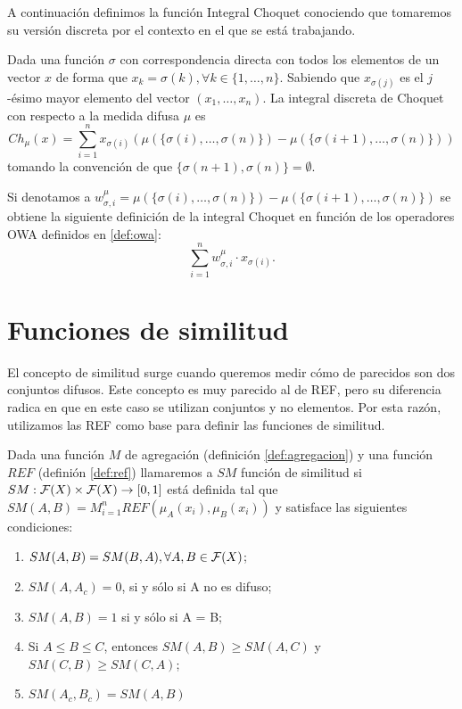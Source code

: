 A continuación definimos la función Integral Choquet conociendo que tomaremos su versión discreta por el contexto en el que se está trabajando.

\begin{definition}\label{def:choquet}
Dada una función $\sigma$  con correspondencia directa con todos los elementos de un vector $x$ de forma que $x_{k}=\sigma(k), \forall k\in\{1,\dots,n\}$. Sabiendo que $x_{\sigma(j)}$ es el $j$-ésimo mayor elemento del vector $(x_{1},\dots,x_{n})$. La integral discreta de Choquet con respecto a la medida difusa $\mu$ es 
$$Ch_{\mu}(x)=\sum_{i=1}^{n}x_{\sigma(i)}(\mu(\{\sigma(i),\dots,\sigma(n)\})-\mu(\{\sigma(i+1),\dots,\sigma(n)\}))$$
tomando la convención de que $\{\sigma(n+1),\sigma(n)\}=\emptyset$.
\end{definition}

\begin{proposition}\label{prop:choque2owa}
Si denotamos a $w_{\sigma, i}^{\mu} = \mu(\{\sigma(i),\dots,\sigma(n)\})-\mu(\{\sigma(i+1),\dots,\sigma(n)\})$ se obtiene la siguiente definición de la integral Choquet en función de los operadores OWA definidos en \ref{def:owa}:
$$\sum_{i=1}^{n} w_{\sigma, i}^{\mu} \cdot x_{\sigma(i)}.$$
\end{proposition}


\section{Funciones de similitud}\label{sec:similitud}
El concepto de similitud \cite{art:fan1, art:fan2} surge cuando queremos medir cómo de parecidos son dos conjuntos difusos. Este concepto es muy parecido al de REF, pero su diferencia radica en que en este caso se utilizan conjuntos y no elementos. Por esta razón, utilizamos las REF como base para definir las funciones de similitud.
\begin{definition}
Dada una función $M$ de agregación (definición \ref{def:agregacion}) y una función $REF$ (definión \ref{def:ref}) llamaremos a $SM$ función de similitud si $SM : \mathcal{F}(X) \times \mathcal{F}(X) \rightarrow [0,1]$ está definida tal que $SM(A,B)=M^n_{i=1}REF(\mu_A(x_i), \mu_B(x_i))$
y satisface las siguientes condiciones:
	\begin{enumerate}
	\item $SM(A, B) = SM(B, A), \forall A, B \in \mathcal{F}(X)$;
	\item $SM(A, A_c) = 0$, si y sólo si A no es difuso;
	\item $SM(A, B) = 1$ si y sólo si A = B;
	\item Si $A\leq B\leq C$, entonces $SM(A, B)\geq SM(A,C)$ y $SM(C, B)\geq SM(C,A)$;
	\item $SM(A_c, B_c) = SM(A,B)$
	\end{enumerate}	
\end{definition}

